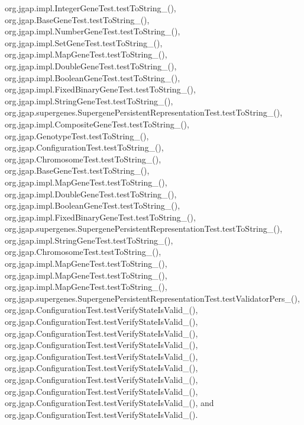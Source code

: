 org.\-jgap.\-impl.\-Integer\-Gene\-Test.\-test\-To\-String\-\_(), org.\-jgap.\-Base\-Gene\-Test.\-test\-To\-String\-\_(), org.\-jgap.\-impl.\-Number\-Gene\-Test.\-test\-To\-String\-\_(), org.\-jgap.\-impl.\-Set\-Gene\-Test.\-test\-To\-String\-\_(), org.\-jgap.\-impl.\-Map\-Gene\-Test.\-test\-To\-String\-\_(), org.\-jgap.\-impl.\-Double\-Gene\-Test.\-test\-To\-String\-\_(), org.\-jgap.\-impl.\-Boolean\-Gene\-Test.\-test\-To\-String\-\_(), org.\-jgap.\-impl.\-Fixed\-Binary\-Gene\-Test.\-test\-To\-String\-\_(), org.\-jgap.\-impl.\-String\-Gene\-Test.\-test\-To\-String\-\_(), org.\-jgap.\-supergenes.\-Supergene\-Persistent\-Representation\-Test.\-test\-To\-String\-\_(), org.\-jgap.\-impl.\-Composite\-Gene\-Test.\-test\-To\-String\-\_(), org.\-jgap.\-Genotype\-Test.\-test\-To\-String\-\_(), org.\-jgap.\-Configuration\-Test.\-test\-To\-String\-\_(), org.\-jgap.\-Chromosome\-Test.\-test\-To\-String\-\_(), org.\-jgap.\-Base\-Gene\-Test.\-test\-To\-String\-\_(), org.\-jgap.\-impl.\-Map\-Gene\-Test.\-test\-To\-String\-\_(), org.\-jgap.\-impl.\-Double\-Gene\-Test.\-test\-To\-String\-\_(), org.\-jgap.\-impl.\-Boolean\-Gene\-Test.\-test\-To\-String\-\_(), org.\-jgap.\-impl.\-Fixed\-Binary\-Gene\-Test.\-test\-To\-String\-\_(), org.\-jgap.\-supergenes.\-Supergene\-Persistent\-Representation\-Test.\-test\-To\-String\-\_(), org.\-jgap.\-impl.\-String\-Gene\-Test.\-test\-To\-String\-\_(), org.\-jgap.\-Chromosome\-Test.\-test\-To\-String\-\_(), org.\-jgap.\-impl.\-Map\-Gene\-Test.\-test\-To\-String\-\_(), org.\-jgap.\-impl.\-Map\-Gene\-Test.\-test\-To\-String\-\_(), org.\-jgap.\-impl.\-Map\-Gene\-Test.\-test\-To\-String\-\_(), org.\-jgap.\-supergenes.\-Supergene\-Persistent\-Representation\-Test.\-test\-Validator\-Pers\-\_(), org.\-jgap.\-Configuration\-Test.\-test\-Verify\-State\-Is\-Valid\-\_(), org.\-jgap.\-Configuration\-Test.\-test\-Verify\-State\-Is\-Valid\-\_(), org.\-jgap.\-Configuration\-Test.\-test\-Verify\-State\-Is\-Valid\-\_(), org.\-jgap.\-Configuration\-Test.\-test\-Verify\-State\-Is\-Valid\-\_(), org.\-jgap.\-Configuration\-Test.\-test\-Verify\-State\-Is\-Valid\-\_(), org.\-jgap.\-Configuration\-Test.\-test\-Verify\-State\-Is\-Valid\-\_(), org.\-jgap.\-Configuration\-Test.\-test\-Verify\-State\-Is\-Valid\-\_(), org.\-jgap.\-Configuration\-Test.\-test\-Verify\-State\-Is\-Valid\-\_(), org.\-jgap.\-Configuration\-Test.\-test\-Verify\-State\-Is\-Valid\-\_(), and org.\-jgap.\-Configuration\-Test.\-test\-Verify\-State\-Is\-Valid\-\_().

